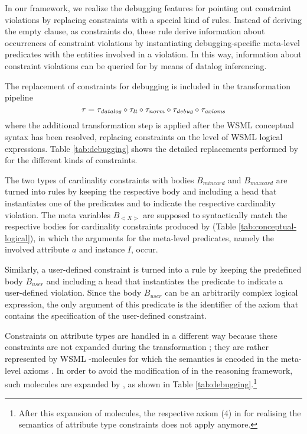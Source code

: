 In our framework, we realize the debugging features for pointing
out constraint violations by replacing constraints with a special
kind of rules. Instead of deriving the empty clause, as
constraints do, these rule derive information about occurrences of
constraint violations by instantiating debugging-specific
meta-level predicates with the entities involved in a violation.
In this way, information about constraint violations can be
queried for by means of datalog inferencing.

The replacement of constraints for debugging is included in the
transformation pipeline
\begin{displaymath}
    \tau = \transdlog \circ \translt \circ \transnorm \circ \transdebug \circ \transax
\end{displaymath}
where the additional transformation step \transdebug is applied
after the WSML conceptual syntax has been resolved, replacing
constraints on the level of WSML logical expressions. Table
\ref{tab:debugging} shows the detailed replacements performed by
\transdebug for the different kinds of constraints.

The two types of cardinality constraints with bodies $B_{mincard}$
and $B_{maxcard}$ are turned into rules by keeping the respective
body and including a head that instantiates one of the predicates
\pvmincard and \pvmaxcard to indicate the respective cardinality
violation. The meta variables $B_{<X>}$ are supposed to
syntactically match the respective bodies for cardinality
constraints produced by \transax (Table
\ref{tab:conceptual-logical}), in which the arguments for the
meta-level predicates, namely the involved attribute $a$ and
instance $I$, occur.

Similarly, a user-defined constraint is turned into a rule by
keeping the predefined body $B_{user}$ and including a head that
instantiates the predicate \pvuser to indicate a user-defined
violation. Since the body $B_{user}$ can be an arbitrarily complex
logical expression, the only argument of this predicate is the
identifier \axiomid of the axiom that contains the  specification
of the user-defined constraint.

Constraints on attribute types are handled in a different way
because these constraints are not expanded during the
transformation \transax ; they are rather represented by WSML
-molecules for which the semantics is encoded in the
meta-level axioms \mlaxioms. In order to avoid the modification of
\mlaxioms in the reasoning framework, such molecules are expanded
by \transdebug, as shown in Table
\ref{tab:debugging}.\footnote{After this expansion of
 molecules, the respective axiom (4) in \mlaxioms for
realising the semantics of attribute type constraints does not
apply anymore.}

